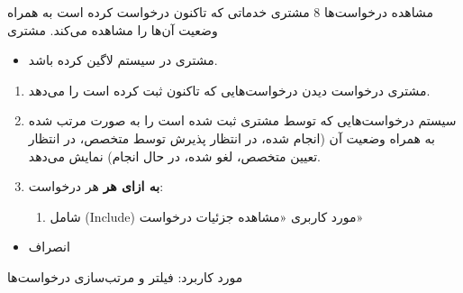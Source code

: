 {
\usecase
{مشاهده درخواست‌ها}
{8}
{مشتری خدماتی که تاکنون درخواست کرده است به همراه وضعیت آن‌ها را مشاهده می‌کند.}
{مشتری}
{}
{	
	\begin{itemize}
		\vspace*{-0.6cm}
		\item 
		مشتری در سیستم لاگین کرده باشد.
	\end{itemize}
}
{
	\vspace*{-0.6cm}
	\begin{enumerate}
		\item
		مشتری درخواست دیدن درخواست‌هایی که تاکنون ثبت کرده است را می‌دهد.
		\item
		سیستم درخواست‌هایی که توسط مشتری ثبت شده است را به صورت مرتب شده به همراه وضعیت آن (انجام شده، در انتظار پذیرش توسط متخصص، در انتظار تعیین متخصص، لغو شده، در حال انجام) نمایش می‌دهد.
		
		\item
		\textbf{به ازای هر} هر درخواست:
		
		\begin{enumerate}[label=\theenumi.\arabic*.]
			\item
			شامل (Include) مورد کاربری «مشاهده جزئیات درخواست»
		\end{enumerate}
	\end{enumerate}
}
{}
{
	\begin{itemize}
		\item
		انصراف
	\end{itemize}
}
{
	مورد کاربرد: فیلتر و مرتب‌سازی درخواست‌ها
}

}


